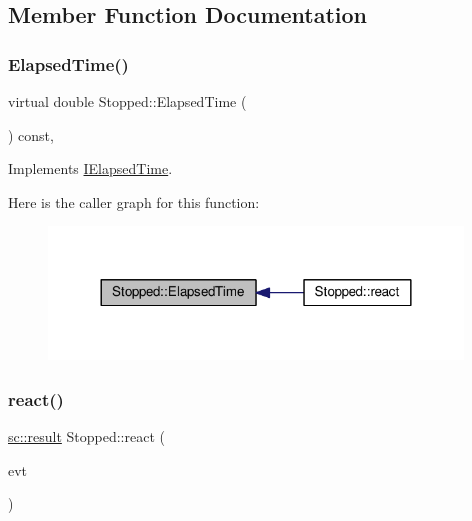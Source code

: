 \subsection{Member Function Documentation}
\mbox{\label{struct_stopped_ae9dec429ddbf79320898e3bdd67580e8}} 
\subsubsection{\texorpdfstring{Elapsed\+Time()}{ElapsedTime()}}
{\footnotesize\ttfamily virtual double Stopped\+::\+Elapsed\+Time (\begin{DoxyParamCaption}{ }\end{DoxyParamCaption}) const\hspace{0.3cm}{\ttfamily [inline]}, {\ttfamily [virtual]}}



Implements \mbox{\hyperlink{struct_i_elapsed_time_a11995710009caacf4343d6d0f79da4ce}{I\+Elapsed\+Time}}.

Here is the caller graph for this function\+:
\nopagebreak
\begin{figure}[H]
\begin{center}
\leavevmode
\includegraphics[width=312pt]{struct_stopped_ae9dec429ddbf79320898e3bdd67580e8_icgraph}
\end{center}
\end{figure}
\mbox{\label{struct_stopped_a47513114d162de9fc052be34a3b84dc3}} 
\subsubsection{\texorpdfstring{react()}{react()}}
{\footnotesize\ttfamily \mbox{\hyperlink{namespaceboost_1_1statechart_abe807f6598b614d6d87bb951ecd92331}{sc\+::result}} Stopped\+::react (\begin{DoxyParamCaption}\item[{const \mbox{\hyperlink{struct_ev_get_elapsed_time}{Ev\+Get\+Elapsed\+Time}} \&}]{evt }\end{DoxyParamCaption})\hspace{0.3cm}{\ttfamily [inline]}}


